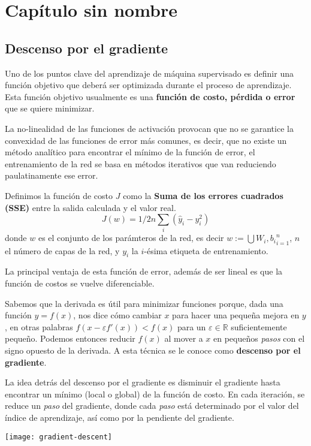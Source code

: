 \section{Capítulo sin nombre}
\subsection{Descenso por el gradiente}
Uno de los puntos clave del aprendizaje de máquina supervisado es
definir una función objetivo que deberá ser optimizada durante el
proceso de aprendizaje. Esta función objetivo usualmente es una
\textbf{función de costo, pérdida o error} que se quiere minimizar.

La no-linealidad de las funciones de activación provocan que no se garantice la convexidad
de las funciones de error más comunes, es decir, que no existe un método analítico para
encontrar el mínimo de la función de error, el entrenamiento de la red se basa en
métodos iterativos que van reduciendo paulatinamente ese error. 

Definimos la función de costo $J$ como la \textbf{Suma de
  los errores cuadrados (SSE)} entre la salida calculada y el valor
real.
\begin{equation}
  J(w)=1/2n \sum_i (\hat{y}_i - y_i^2)
\end{equation}
donde $w$ es el conjunto de los parámteros de la red, es decir
$w := \bigcup{W_i, b_i}_{i=1}^{n}$, $n$ el número de capas de la red, y $y_i$
la $i$-ésima etiqueta de entrenamiento.

La principal ventaja de esta función de error, además de ser lineal
es que la función de costos se vuelve diferenciable.

Sabemos que la derivada es útil para minimizar funciones porque, dada una función
$y = f(x)$, nos dice cómo cambiar $x$ para hacer una pequeña mejora en $y$, en
otras palabras $f(x-\varepsilon f'(x)) < f(x)$ para un $\varepsilon \in \mathbb{R}$
suficientemente pequeño. Podemos entonces reducir $f(x)$ al mover a $x$ en pequeños
\textit{pasos} con el signo opuesto de la derivada. A esta técnica se le conoce como
\textbf{descenso por el gradiente}.

La idea detrás del descenso por el gradiente es disminuir el gradiente hasta encontrar
un mínimo (local o global) de la función de costo. En cada iteración, se reduce
un \textit{paso} del gradiente, donde cada \textit{paso} está determinado por
el valor del índice de aprendizaje, así como por la pendiente del gradiente.

\texttt{[image: gradient-descent]}

